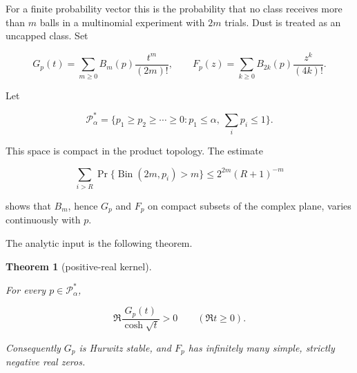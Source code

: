 \documentclass[11pt]{article}
\newtheorem{theorem}{Theorem}[section]
\begin{document}
For a finite probability vector this is the probability that no class receives
more than $m$ balls in a multinomial experiment with $2m$ trials.  Dust is
treated as an uncapped class.  Set

\[
G_p(t)=\sum_{m\ge0}B_m(p)\frac{t^m}{(2m)!},\qquad
F_p(z)=\sum_{k\ge0}B_{2k}(p)\frac{z^k}{(4k)!}. \tag{3.2}
\]

Let

\[
\mathcal P_\alpha^*=\{p_1\ge p_2\ge\cdots\ge0:
p_1\le\alpha,\ \sum_i p_i\le1\}. \tag{3.3}
\]

This space is compact in the product topology.  The estimate

\[
\sum_{i>R}\Pr\{\operatorname{Bin}(2m,p_i)>m\}
\le 2^{2m}(R+1)^{-m} \tag{3.4}
\]

shows that $B_m$, hence $G_p$ and $F_p$ on compact subsets of the
complex plane, varies continuously with $p$.

The analytic input is the following theorem.

\Needspace{0.16\textheight}
\begin{theorem}[positive-real kernel]
\label{theorem:3-1}

For every $p\in\mathcal P_\alpha^*$,

\[
\Re\frac{G_p(t)}{\cosh\sqrt t}>0\qquad(\Re t\ge0). \tag{3.5}
\]

Consequently $G_p$ is Hurwitz stable, and $F_p$ has infinitely many simple,
strictly negative real zeros.

\end{theorem}
\end{document}
